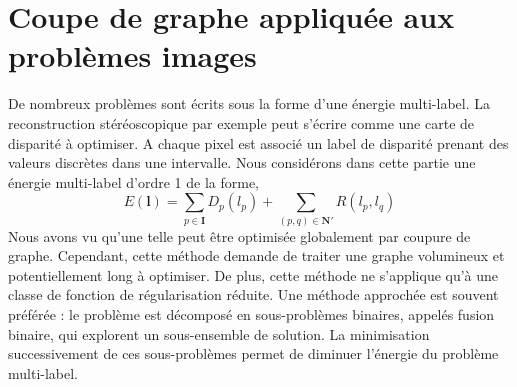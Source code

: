 \documentclass[../main/These_Mathias_Paget.tex]{subfiles}
\begin{document}

\chapter{Coupe de graphe appliquée aux problèmes images}

	De nombreux problèmes sont écrits sous la forme d'une énergie multi-label. La reconstruction stéréoscopique par exemple peut s'écrire comme une carte de disparité à optimiser. A chaque pixel est associé un label de disparité prenant des valeurs discrètes dans une intervalle. Nous considérons dans cette partie une énergie multi-label d'ordre 1 de la forme,
	\begin{equation}
	\label{eq:Emulti}
	E(\boldsymbol{l}) = \sum_{p \in \boldsymbol{I}} D_p(l_p) +  \sum_{(p,q) \in \boldsymbol{N'}} R(l_p,l_q)
	\end{equation}
	Nous avons vu qu'une telle peut être optimisée globalement par coupure de graphe. Cependant, cette méthode demande de traiter une graphe volumineux et potentiellement long à optimiser. De plus, cette méthode ne s'applique qu'à une classe de fonction de régularisation réduite. Une méthode approchée est souvent préférée : le problème est décomposé en sous-problèmes binaires, appelés fusion binaire, qui explorent un sous-ensemble de solution. La minimisation successivement de ces sous-problèmes permet de diminuer l’énergie du problème multi-label.
\end{document}
